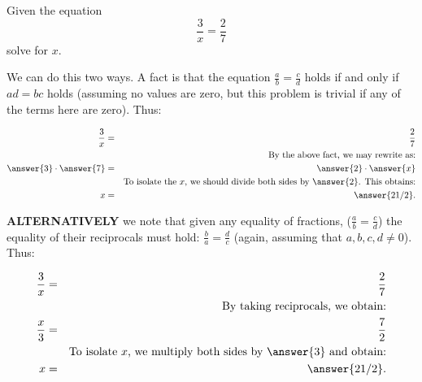 \documentclass{ximera}
\begin{document}
\begin{question}
Given the equation $$\frac{3}{x}=\frac{2}{7}$$ solve for $x$.

We can do this two ways.  A fact is that the equation $\frac{a}{b}=\frac{c}{d}$ holds if and only if $ad=bc$ holds (assuming no values are zero, but this problem is trivial if any of the terms here are zero).  Thus:

\begin{eqnarray*}
\frac{3}{x}&=& \frac{2}{7}\\
&&\text{By the above fact, we may rewrite as:}\\
\answer{3}\cdot\answer{7}&=& \answer{2}\cdot\answer{x}\\
&&\text{To isolate the $x$, we should divide both sides by $\answer{2}$.  This obtains:}\\
x&=& \answer{21/2}.
\end{eqnarray*}

\textbf{ALTERNATIVELY} we note that given any equality of fractions, ($\frac{a}{b}=\frac{c}{d}$) the equality of their reciprocals must hold: $\frac{b}{a}=\frac{d}{c}$ (again, assuming that $a,b,c,d\neq0$).  Thus:

\begin{eqnarray*}
\frac{3}{x}&=& \frac{2}{7}\\
&&\text{By taking reciprocals, we obtain:}\\
\frac{x}{3}&=& \frac{7}{2}\\
&&\text{To isolate $x$, we multiply both sides by $\answer{3}$ and obtain:}\\
x&=& \answer{21/2}.
\end{eqnarray*}


\end{question}
\end{document}
